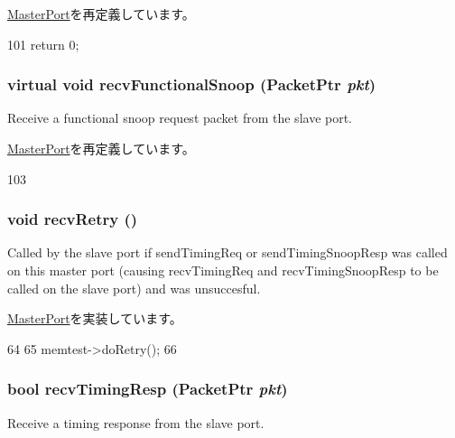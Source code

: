\hyperlink{classMasterPort_ae1160d8f94f042aba1dc9a07a72e1e82}{MasterPort}を再定義しています。


\begin{DoxyCode}
101 { return 0; }
\end{DoxyCode}
\hypertarget{classMemTest_1_1CpuPort_af5b15bc08781cf0ba6190efc37d5b67e}{
\subsubsection[{recvFunctionalSnoop}]{\setlength{\rightskip}{0pt plus 5cm}virtual void recvFunctionalSnoop ({\bf PacketPtr} {\em pkt})}}
\label{classMemTest_1_1CpuPort_af5b15bc08781cf0ba6190efc37d5b67e}
Receive a functional snoop request packet from the slave port. 

\hyperlink{classMasterPort_af5b15bc08781cf0ba6190efc37d5b67e}{MasterPort}を再定義しています。


\begin{DoxyCode}
103 { }
\end{DoxyCode}
\hypertarget{classMemTest_1_1CpuPort_a29cb5a4f98063ce6e9210eacbdb35298}{
\subsubsection[{recvRetry}]{\setlength{\rightskip}{0pt plus 5cm}void recvRetry ()}}
\label{classMemTest_1_1CpuPort_a29cb5a4f98063ce6e9210eacbdb35298}
Called by the slave port if sendTimingReq or sendTimingSnoopResp was called on this master port (causing recvTimingReq and recvTimingSnoopResp to be called on the slave port) and was unsuccesful. 

\hyperlink{classMasterPort_ac1ccc3bcf7ebabb20b57fab99b2be5b0}{MasterPort}を実装しています。


\begin{DoxyCode}
64 {
65     memtest->doRetry();
66 }
\end{DoxyCode}
\hypertarget{classMemTest_1_1CpuPort_a482dba5588f4bee43e498875a61e5e0b}{
\subsubsection[{recvTimingResp}]{\setlength{\rightskip}{0pt plus 5cm}bool recvTimingResp ({\bf PacketPtr} {\em pkt})}}
\label{classMemTest_1_1CpuPort_a482dba5588f4bee43e498875a61e5e0b}
Receive a timing response from the slave port. 

